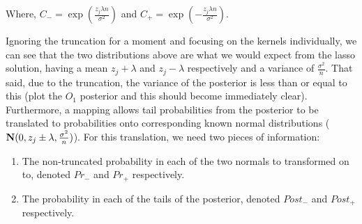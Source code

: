 
Where, $C_{-} = \exp(\frac{z_j \lambda n}{\sigma^2})$ and $C_{+} = \exp(-\frac{z_j \lambda n}{\sigma^2})$.

Ignoring the truncation for a moment and focusing on the kernels individually, we can see that the two distributions above are what we would expect from the lasso solution, having a mean $z_j + \lambda$ and $z_j - \lambda$ respectively and a variance of $\frac{\sigma^2}{n}$. That said, due to the truncation, the variance of the posterior is less than or equal to this (plot the $O_1$ posterior and this should become immediately clear). Furthermore, a mapping allows tail probabilities from the posterior to be translated to probabilities onto corresponding known normal distributions ($\mathbf{N}(0, z_j \pm \lambda, \frac{\sigma^2}{n})$). For this translation, we need two pieces of information:

\begin{enumerate}
\item The non-truncated probability in each of the two normals to transformed on to, denoted $Pr_{-}$ and $Pr_{+}$ respectively.
\item The probability in each of the tails of the posterior, denoted $Post_{-}$ and $Post_{+}$ respectively.
\end{enumerate}

